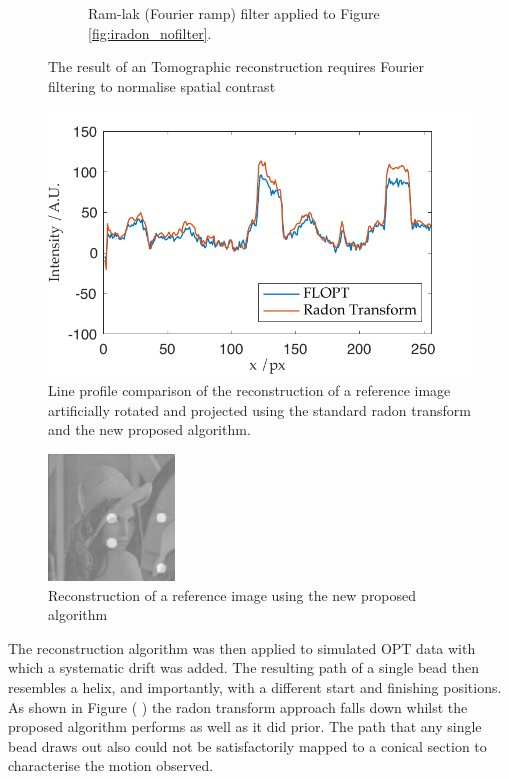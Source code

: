 \begin{figure}
\begin{subfigure}[t]{0.3\textwidth}
    \caption{Ram-lak (Fourier ramp) filter applied to Figure \ref{fig:iradon_nofilter}.}
    \label{fig:iradon_filter}
  \end{subfigure}
    \hfill
    \label{fig:irandons}
  \caption{The result of an Tomographic reconstruction requires Fourier filtering to normalise spatial contrast}
\end{figure}

\begin{figure}
  \centering
  \includegraphics{Chapters/flopt/Figs/PDF/results/comparison_line_profile}
  \caption{Line profile comparison of the reconstruction of a reference image artificially rotated and projected using the standard radon transform and the new proposed algorithm.}
  \label{fig:flopt_comparison_line_profile}
\end{figure}

\begin{figure}
  \centering
  \includegraphics[width=0.3\textwidth]{Chapters/flopt/Figs/PDF/results/no_helix/flopt_filter}
\caption{Reconstruction of a reference image using the new proposed algorithm}
\label{fig:flopt_filter}
\end{figure}

The reconstruction algorithm was then applied to simulated OPT data with which a systematic drift was added.
The resulting path of a single bead then resembles a helix, and importantly, with a different start and finishing positions.
As shown in Figure (%
) the radon transform approach falls down whilst the proposed algorithm performs as well as it did prior.
The path that any single bead draws out also could not be satisfactorily mapped to a conical section to characterise the motion observed.


